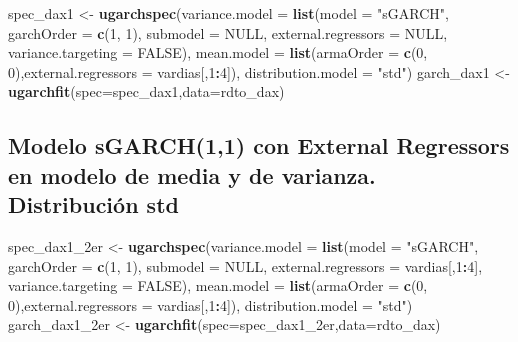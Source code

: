 \documentclass[
  11pt,
]{article}
\newenvironment{Shaded}{\begin{snugshade}}{\end{snugshade}}
\newcommand{\DataTypeTok}[1]{\textcolor[rgb]{0.13,0.29,0.53}{#1}}
\newcommand{\DecValTok}[1]{\textcolor[rgb]{0.00,0.00,0.81}{#1}}
\newcommand{\KeywordTok}[1]{\textcolor[rgb]{0.13,0.29,0.53}{\textbf{#1}}}
\newcommand{\NormalTok}[1]{#1}
\newcommand{\OperatorTok}[1]{\textcolor[rgb]{0.81,0.36,0.00}{\textbf{#1}}}
\newcommand{\OtherTok}[1]{\textcolor[rgb]{0.56,0.35,0.01}{#1}}
\newcommand{\StringTok}[1]{\textcolor[rgb]{0.31,0.60,0.02}{#1}}
\begin{document}
\begin{Shaded}
\begin{Highlighting}[]
\NormalTok{spec_dax1 <-}\StringTok{ }\KeywordTok{ugarchspec}\NormalTok{(}\DataTypeTok{variance.model =} \KeywordTok{list}\NormalTok{(}\DataTypeTok{model =} \StringTok{"sGARCH"}\NormalTok{, }\DataTypeTok{garchOrder =} \KeywordTok{c}\NormalTok{(}\DecValTok{1}\NormalTok{, }\DecValTok{1}\NormalTok{), }
                        \DataTypeTok{submodel =} \OtherTok{NULL}\NormalTok{, }\DataTypeTok{external.regressors =} \OtherTok{NULL}\NormalTok{, }\DataTypeTok{variance.targeting =} \OtherTok{FALSE}\NormalTok{), }
                        \DataTypeTok{mean.model =} \KeywordTok{list}\NormalTok{(}\DataTypeTok{armaOrder =} \KeywordTok{c}\NormalTok{(}\DecValTok{0}\NormalTok{, }\DecValTok{0}\NormalTok{),}\DataTypeTok{external.regressors =}\NormalTok{ vardias[,}\DecValTok{1}\OperatorTok{:}\DecValTok{4}\NormalTok{]),}
                        \DataTypeTok{distribution.model =} \StringTok{"std"}\NormalTok{)}
\NormalTok{garch_dax1 <-}\StringTok{ }\KeywordTok{ugarchfit}\NormalTok{(}\DataTypeTok{spec=}\NormalTok{spec_dax1,}\DataTypeTok{data=}\NormalTok{rdto_dax)}
\end{Highlighting}
\end{Shaded}

\hypertarget{modelo-sgarch11-con-external-regressors-en-modelo-de-media-y-de-varianza.-distribuciuxf3n-std}{%
\subsection{Modelo sGARCH(1,1) con External Regressors en modelo de
media y de varianza. Distribución
std}\label{modelo-sgarch11-con-external-regressors-en-modelo-de-media-y-de-varianza.-distribuciuxf3n-std}}

\begin{Shaded}
\begin{Highlighting}[]
\NormalTok{spec_dax1_2er <-}\StringTok{ }\KeywordTok{ugarchspec}\NormalTok{(}\DataTypeTok{variance.model =} \KeywordTok{list}\NormalTok{(}\DataTypeTok{model =} \StringTok{"sGARCH"}\NormalTok{, }\DataTypeTok{garchOrder =} \KeywordTok{c}\NormalTok{(}\DecValTok{1}\NormalTok{, }\DecValTok{1}\NormalTok{), }
                        \DataTypeTok{submodel =} \OtherTok{NULL}\NormalTok{, }\DataTypeTok{external.regressors =}\NormalTok{ vardias[,}\DecValTok{1}\OperatorTok{:}\DecValTok{4}\NormalTok{], }\DataTypeTok{variance.targeting =} \OtherTok{FALSE}\NormalTok{), }
                        \DataTypeTok{mean.model =} \KeywordTok{list}\NormalTok{(}\DataTypeTok{armaOrder =} \KeywordTok{c}\NormalTok{(}\DecValTok{0}\NormalTok{, }\DecValTok{0}\NormalTok{),}\DataTypeTok{external.regressors =}\NormalTok{ vardias[,}\DecValTok{1}\OperatorTok{:}\DecValTok{4}\NormalTok{]),}
                        \DataTypeTok{distribution.model =} \StringTok{"std"}\NormalTok{)}
\NormalTok{garch_dax1_2er <-}\StringTok{ }\KeywordTok{ugarchfit}\NormalTok{(}\DataTypeTok{spec=}\NormalTok{spec_dax1_2er,}\DataTypeTok{data=}\NormalTok{rdto_dax)}
\end{Highlighting}
\end{Shaded}
\end{document}
